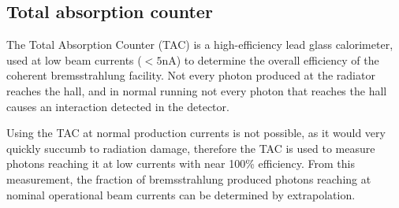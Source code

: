 %
%
%
%


\subsection{Total absorption counter \label{sec:tac}}
The Total Absorption Counter (TAC) is a high-efficiency lead glass calorimeter, used at low beam currents ($<5$nA) to determine the overall efficiency of the coherent bremsstrahlung facility.
Not every photon produced at the radiator reaches the hall, and in normal \GX{} running not every photon that reaches the hall causes an interaction detected in the \GX{} detector.

Using the TAC at normal \GX{} production currents is not possible, as it would very quickly succumb to radiation damage, therefore the TAC is used to measure photons reaching it at low currents with near 100\% efficiency.
From this measurement, the fraction of bremsstrahlung produced photons reaching \GX{} at nominal operational beam currents can be determined by extrapolation.

